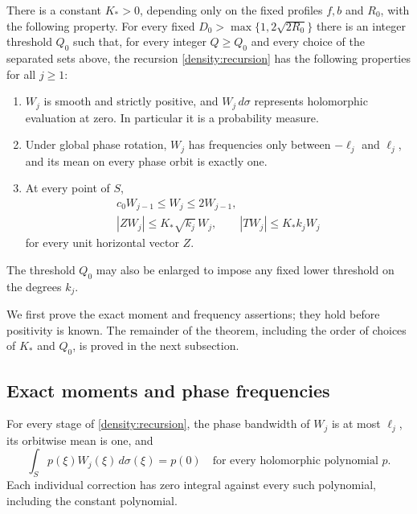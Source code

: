 \begin{theorem}\label{density:main}
There is a constant $K_*>0$, depending only on the fixed profiles
$f,b$ and $R_0$, with the following property.  For every fixed
$D_0>\max\{1,2\sqrt{2R_0}\}$ there is an integer threshold $Q_0$
such that, for every integer $Q\ge Q_0$ and every choice of the
separated sets above, the recursion \eqref{density:recursion}
has the following properties for all $j\ge1$:
\begin{enumerate}
\item $W_j$ is smooth and strictly positive, and $W_j\,d\sigma$
represents holomorphic evaluation at zero.  In particular it is
a probability measure.
\item Under global phase rotation, $W_j$ has frequencies only
between $-\ell_j$ and $\ell_j$, and its mean on every phase orbit
is exactly one.
\item At every point of $S$,
\begin{equation}\label{density:uniform-bounds}
 \begin{gathered}
 c_0W_{j-1}\le W_j\le2W_{j-1},\\
 |ZW_j|\le K_*\sqrt{k_j}\,W_j,
 \qquad |TW_j|\le K_*k_jW_j
 \end{gathered}
\end{equation}
for every unit horizontal vector $Z$.
\end{enumerate}
The threshold $Q_0$ may also be enlarged to impose any fixed lower
threshold on the degrees $k_j$.
\end{theorem}

We first prove the exact moment and frequency assertions; they
hold before positivity is known.  The remainder of the theorem,
including the order of choices of $K_*$ and $Q_0$, is proved in
the next subsection.

\subsection{Exact moments and phase frequencies}

\begin{lemma}\label{density:moments}
For every stage of \eqref{density:recursion}, the phase bandwidth
of $W_j$ is at most $\ell_j$, its orbitwise mean is one, and
\begin{equation}\label{density:representing}
 \int_S p(\xi)W_j(\xi)\,d\sigma(\xi)=p(0)
 \quad\text{for every holomorphic polynomial }p.
\end{equation}
Each individual correction has zero integral against every such
polynomial, including the constant polynomial.
\end{lemma}

